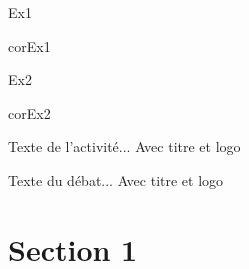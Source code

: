 \documentclass[nocrop]{sesamanuel}
\begin{document}
\begin{autoeval}  
    \begin{exercice}
      Ex1
    \end{exercice}
    \begin{corrige}
      corEx1
    \end{corrige}
    \begin{exercice}
      Ex2
    \end{exercice}
    \begin{corrige}
      corEx2
    \end{corrige}
\end{autoeval}

\activites
\begin{activite}
  Texte de l’activité... Avec titre et logo
\end{activite}
\begin{debat}
  Texte du débat... Avec titre et logo
\end{debat}

\cours
\section{Section 1}
\end{document}
